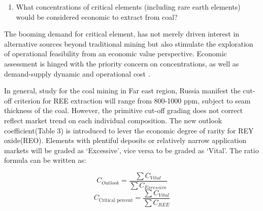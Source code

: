 \documentclass[preprint, 3p,
authoryear]{elsarticle} %
\providecommand{\tightlist}{%
  \setlength{\itemsep}{0pt}\setlength{\parskip}{0pt}}
\begin{document}
\begin{enumerate}
\def\labelenumi{\arabic{enumi}.}
\setcounter{enumi}{2}
\tightlist
\item
  What concentrations of critical elements (including rare earth
  elements) would be considered economic to extract from coal?
\end{enumerate}

The booming demand for critical element, has not merely driven interest
in alternative sources beyond traditional mining but also stimulate the
exploration of operational feasibility from an economic value
perspective. Economic assessment is hinged with the priority concern on
concentrations, as well as demand-supply dynamic and operational cost
\citet{usde2017}.

In general, \citet{Seredin2012} study for the coal mining in Far east
region, Russia manifest the cut-off criterion for REE extraction will
range from 800-1000 ppm, subject to seam thickness of the coal. However,
the primitive cut-off grading does not correct reflect market trend on
each individual composition. The new outlook coefficient(Table 3) is
introduced to lever the economic degree of rarity for REY oxide(REO).
Elements with plentiful deposits or relatively narrow application
markets will be graded as `Excessive', vice versa to be graded as
`Vital'. The ratio formula can be written as:

\[ \tag{1} C_{Outlook}=\frac{\sum{C_{Vital}}}{\sum{C_{Excessive}}}  \]
\[ \tag{2} C_{\text{Critical percent}}=\frac{\sum{C_{Vital}}}{\sum{C_{REE}}} \]
\end{document}
